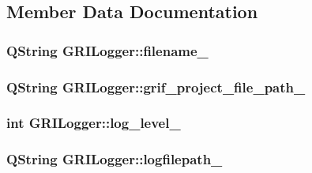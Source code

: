 \subsection{\-Member \-Data \-Documentation}
\hypertarget{classGRILogger_aee75dc42ec31c6b8668ba18606c16d1b}{
\subsubsection[{filename\-\_\-}]{\setlength{\rightskip}{0pt plus 5cm}\-Q\-String {\bf \-G\-R\-I\-Logger\-::filename\-\_\-}}}\label{classGRILogger_aee75dc42ec31c6b8668ba18606c16d1b}
\hypertarget{classGRILogger_aa1280ba96497c651f21c80929baaa582}{
\subsubsection[{grif\-\_\-project\-\_\-file\-\_\-path\-\_\-}]{\setlength{\rightskip}{0pt plus 5cm}\-Q\-String {\bf \-G\-R\-I\-Logger\-::grif\-\_\-project\-\_\-file\-\_\-path\-\_\-}}}\label{classGRILogger_aa1280ba96497c651f21c80929baaa582}
\hypertarget{classGRILogger_acc78c8a84f847872fabee9af161fc4d9}{
\subsubsection[{log\-\_\-level\-\_\-}]{\setlength{\rightskip}{0pt plus 5cm}int {\bf \-G\-R\-I\-Logger\-::log\-\_\-level\-\_\-}}}\label{classGRILogger_acc78c8a84f847872fabee9af161fc4d9}
\hypertarget{classGRILogger_aed2b4ca9781c7faf1fce8ee5a4ccc760}{
\subsubsection[{logfilepath\-\_\-}]{\setlength{\rightskip}{0pt plus 5cm}\-Q\-String {\bf \-G\-R\-I\-Logger\-::logfilepath\-\_\-}}}\label{classGRILogger_aed2b4ca9781c7faf1fce8ee5a4ccc760}
